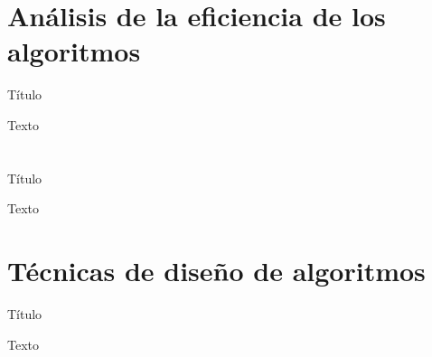 \section{Análisis de la eficiencia de los algoritmos}

\begin{frame}[c]{Título}
    \begin{center}
        Texto
    \end{center}
\end{frame}

\section{}

\begin{frame}[c]{Título}
    \begin{center}
        Texto
    \end{center}
\end{frame}

\section{Técnicas de diseño de algoritmos}

\begin{frame}[c]{Título}
    \begin{center}
        Texto
    \end{center}
\end{frame}
